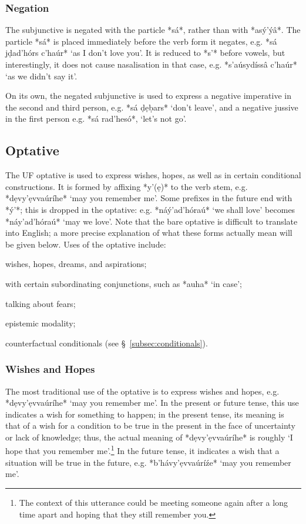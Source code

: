 \documentclass[a4paper, 12pt, oneside, final]{article}
\newlength{\EnumItemSep} \EnumItemSep-3pt
\newenvironment { enum } [1] [0] {
    \vspace { -.5em }
    \settowidth \leftmargini { 99.\hskip\labelsep }
    \begin { enumerate }
    \setcounter { enumi } { #1 }
    \itemsep \EnumItemSep
} {
    \end { enumerate }
    \vspace { -.5em }
}
\begin{document}
\subsubsection{Negation}\label{subsubsec:negated-subjunctive}
The subjunctive is negated with the particle *sá*, rather than with *asý’ýâ*. The particle *sá* is placed
immediately before the verb form it negates, e.g. *sá jḍad’hórs c’haúr* ‘as I don’t love you’. It is reduced
to *s’* before vowels, but interestingly, it does not cause nasalisation in that case, e.g. *s’aúsydíssâ c’haúr*
‘as we didn’t say it’.

On its own, the negated subjunctive is used to express a negative imperative in the second and third person,
e.g. *sá ḍẹḅars* ‘don’t leave’, and a negative jussive in the first person e.g. *sá rad’hesó*, ‘let’s not go’.

\subsection{Optative}\label{subsec:optative}
The UF optative is used to express wishes, hopes, as well as in certain conditional constructions. It is formed
by affixing *y’(ẹ)* to the verb stem, e.g. *dẹvy’ẹvvaúríhe* ‘may you remember me’. Some prefixes in the future end with
*ý’*; this is dropped in the optative: e.g. *náý’ad’hóraú* ‘we shall love’ becomes *náy’ad’hóraú* ‘may we love’. Note
that the bare optative is difficult to translate into English; a more precise explanation of what these forms actually
mean will be given below. Uses of the optative include:
\begin{enum}
\item wishes, hopes, dreams, and aspirations;
\item with certain subordinating conjunctions, such as *auha* ‘in case’;
\item talking about fears;
\item epistemic modality;
\item counterfactual conditionals (see §~\ref{subsec:conditionals}).
\end{enum}

\subsubsection{Wishes and Hopes}
The most traditional use of the optative is to express wishes and hopes, e.g. *dẹvy’ẹvvaúríhe* ‘may you remember me’. In
the present or future tense, this use indicates a wish for something to happen; in the present tense, its meaning is
that of a wish for a condition to be true in the present in the face of uncertainty or lack of knowledge; thus, the
actual meaning of *dẹvy’ẹvvaúríhe* is roughly ‘I hope that you remember me’.\footnote{The context of this utterance could be
meeting someone again after a long time apart and hoping that they still remember you.} In the future tense, it indicates a wish
that a situation will be true in the future, e.g. *b’hávy’ẹvvaúríźe* ‘may you remember me’.
\end{document}
